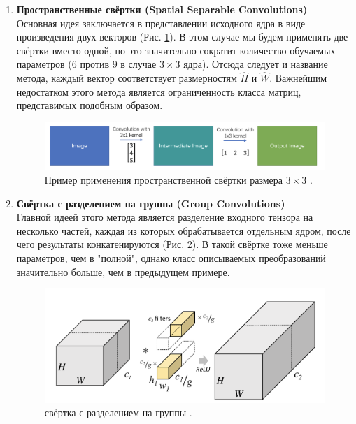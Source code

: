 \documentclass[12pt, fleqn]{article}
\begin{document}
    \begin{enumerate}
        \item \textbf{Пространственные свёртки (Spatial Separable Convolutions)}\\
        Основная идея заключается в представлении исходного ядра в виде произведения 
        двух векторов (Рис. \ref{sep_conv}). В этом случае мы будем применять две свёртки вместо одной, 
        но это значительно сократит количество обучаемых параметров ($6$ против $9$ в случае $3 \times 3$ ядра). 
        Отсюда следует и название метода, каждый вектор соответствует размерностям 
        $\hat{H}$ и $\hat{W}$. Важнейшим недостатком этого метода является 
        ограниченность класса матриц, представимых подобным образом.

        \begin{figure}[ht]
            \centering
            \includegraphics[scale=0.6]{pics/sep_conv.png}
            \caption{Пример применения пространственной свёртки размера $3 \times 3$ \cite{sep_conv}.}
            \label{sep_conv}
        \end{figure}

        \item \textbf{Свёртка с разделением на группы (Group Convolutions)}\\
        Главной идеей этого метода является разделение входного тензора
        на несколько частей, каждая из которых обрабатывается отдельным ядром, 
        после чего результаты конкатенируются (Рис. \ref{conv_group}). В такой 
        свёртке тоже меньше параметров, чем в "полной", однако класс описываемых 
        преобразований значительно больше, чем в предыдущем примере.

        \begin{figure}[ht]
            \centering
            \includegraphics[scale=0.3]{pics/conv_group.png}
            \caption{свёртка с разделением на группы \cite{group_conv}.}
            \label{conv_group}
        \end{figure}
        

\end{enumerate}
\end{document}
